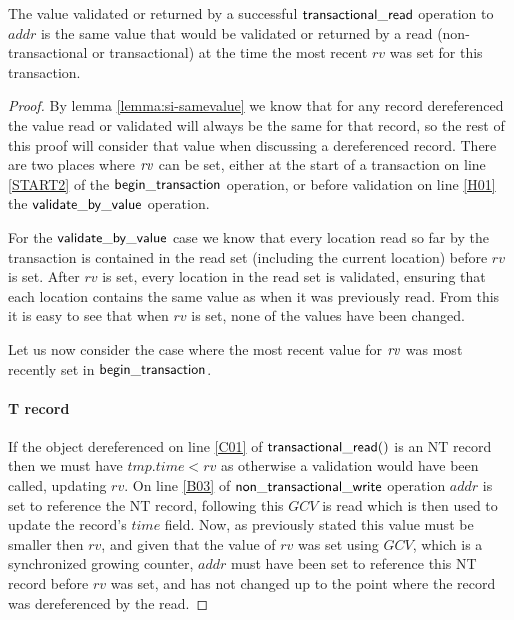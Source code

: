 \begin{lemma}
\label{lemma:si-rvvalid}
The value validated or returned by a successful $\sf{transactional\_read}$ operation to $\mathit{addr}$ is the same
value that would be validated or returned by a read (non-transactional or transactional) at the time the most recent
$\mathit{rv}$ was set for this transaction.
\end{lemma}
\begin{proof}
By lemma \ref{lemma:si-samevalue} we know that for any record dereferenced the value read or validated will
always be the same for that record, so the rest of this proof will consider that value when discussing
a dereferenced record.
There are two places where $\ms{rv}$ can be set, either at the start of a transaction on line \ref{START2} of the
$\sf{begin\_transaction}$ operation, or before validation on line \ref{H01} the $\sf{validate\_by\_value}$ operation.


For the $\sf{validate\_by\_value}$ case we know that every location read so far by the transaction is contained
in the read set (including the current location) before $\mathit{rv}$ is set.
After $\mathit{rv}$ is set, every location in the read set is validated, ensuring that each location contains the same
value as when it was previously read.
From this it is easy to see that when $\mathit{rv}$ is set, none of the values have been changed.

Let us now consider the case where the most recent value for $\ms{rv}$ was most recently set in $\sf{begin\_transaction}$.

\paragraph{T record} If the object dereferenced on line \ref{C01} of $\sf{transactional\_read}()$ is an NT record then we must have $\mathit{tmp.time} < \mathit{rv}$
as otherwise a validation would have been called, updating $\mathit{rv}$.
On line \ref{B03} of $\sf{non\_transactional\_write}$ operation $\mathit{addr}$ is set to reference the NT record, following this
$\mathit{GCV}$ is read which is then used to update the record's $\mathit{time}$ field.
Now, as previously stated this value must be smaller then $\mathit{rv}$, and given that the value of $\mathit{rv}$
was set using $\mathit{GCV}$, which is a synchronized growing counter, $\mathit{addr}$ must have been set to reference
this NT record before $\mathit{rv}$ was set, and has not changed up to the point where the record was dereferenced by the read.


\end{proof}
